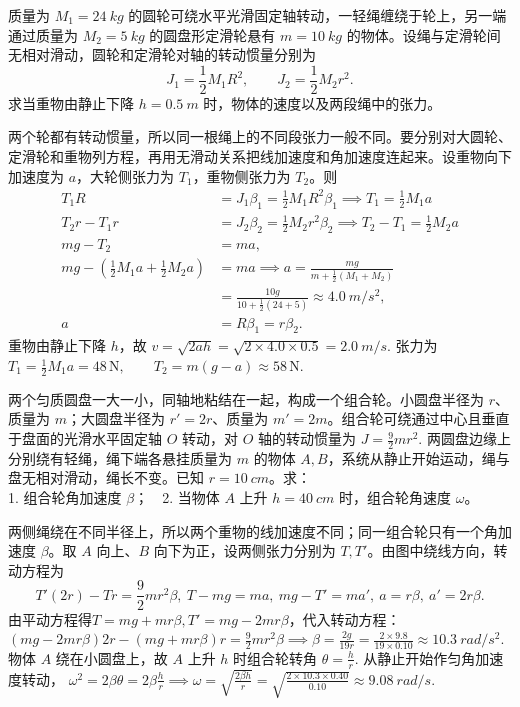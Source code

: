 \begin{exercise}
质量为 \(M_1=\SI{24}{kg}\) 的圆轮可绕水平光滑固定轴转动，一轻绳缠绕于轮上，另一端通过质量为 \(M_2=\SI{5}{kg}\) 的圆盘形定滑轮悬有 \(m=\SI{10}{kg}\) 的物体。设绳与定滑轮间无相对滑动，圆轮和定滑轮对轴的转动惯量分别为
\[
J_1=\frac12 M_1R^2,\qquad J_2=\frac12 M_2r^2.
\]
求当重物由静止下降 \(h=\SI{0.5}{m}\) 时，物体的速度以及两段绳中的张力。
\end{exercise}
\begin{solution}
两个轮都有转动惯量，所以同一根绳上的不同段张力一般不同。要分别对大圆轮、定滑轮和重物列方程，再用无滑动关系把线加速度和角加速度连起来。设重物向下加速度为 \(a\)，大轮侧张力为 \(T_1\)，重物侧张力为 \(T_2\)。则
\[
\begin{aligned}
T_1R&=J_1\beta_1=\frac12M_1R^2\beta_1\implies T_1=\frac12M_1a\\
T_2r-T_1r&=J_2\beta_2=\frac12M_2r^2\beta_2\implies T_2-T_1=\frac12M_2a\\
mg-T_2&=ma,\\
mg-\left(\frac12M_1a+\frac12M_2a\right)&=ma
\implies
a=\frac{mg}{m+\frac12(M_1+M_2)}\\
&=\frac{10g}{10+\frac12(24+5)}
\approx \SI{4.0}{m/s^2},\\
a&=R\beta_1=r\beta_2.
\end{aligned}
\]
重物由静止下降 \(h\)，故
 \(v=\sqrt{2ah} =\sqrt{2\times4.0\times0.5} =\SI{2.0}{m/s}.\) 
张力为
 \(T_1=\frac12M_1a=48\,\mathrm{N},\qquad T_2=m(g-a)\approx 58\,\mathrm{N}.\) 
\end{solution}

\begin{exercise}
两个匀质圆盘一大一小，同轴地粘结在一起，构成一个组合轮。小圆盘半径为 \(r\)、质量为 \(m\)；大圆盘半径为 \(r'=2r\)、质量为 \(m'=2m\)。组合轮可绕通过中心且垂直于盘面的光滑水平固定轴 \(O\) 转动，对 \(O\) 轴的转动惯量为
 \(J=\frac{9}{2}mr^2.\) 
两圆盘边缘上分别绕有轻绳，绳下端各悬挂质量为 \(m\) 的物体 \(A,B\)，系统从静止开始运动，绳与盘无相对滑动，绳长不变。已知 \(r=\SI{10}{cm}\)。求：\\
1. 组合轮角加速度 \(\beta\)；~~2. 当物体 \(A\) 上升 \(h=\SI{40}{cm}\) 时，组合轮角速度 \(\omega\)。
\end{exercise}
\begin{solution}
两侧绳绕在不同半径上，所以两个重物的线加速度不同；同一组合轮只有一个角加速度 \(\beta\)。取 \(A\) 向上、\(B\) 向下为正，设两侧张力分别为 \(T,T'\)。由图中绕线方向，转动方程为
\[
T'(2r)-Tr=\frac{9}{2}mr^2\beta,~T-mg=ma,~mg-T'=ma',~a=r\beta,~a'=2r\beta.
\]
由平动方程得$T=mg+mr\beta,T'=mg-2mr\beta$，代入转动方程：
 \((mg-2mr\beta)2r-(mg+mr\beta)r =\frac{9}{2}mr^2\beta \implies \beta=\frac{2g}{19r}=\frac{2\times9.8}{19\times0.10} \approx \SI{10.3}{rad/s^2}.\) 
物体 \(A\) 绕在小圆盘上，故 \(A\) 上升 \(h\) 时组合轮转角
 \(\theta=\frac{h}{r}.\) 
从静止开始作匀角加速度转动，
 \(\omega^2=2\beta\theta=2\beta\frac{h}{r}\implies \omega=\sqrt{\frac{2\beta h}{r}} =\sqrt{\frac{2\times10.3\times0.40}{0.10}} \approx \SI{9.08}{rad/s}.\) 
\end{solution}

